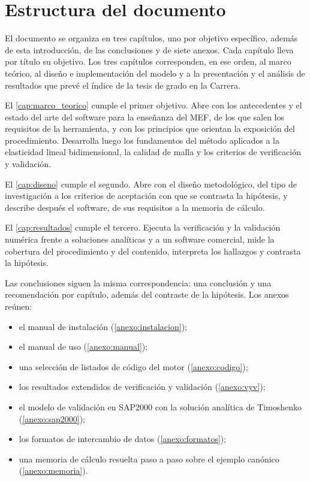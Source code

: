 \section*{Estructura del documento}

El documento se organiza en tres capítulos, uno por objetivo específico, además de esta introducción, de las conclusiones y de siete anexos. Cada capítulo lleva por título su objetivo. Los tres capítulos corresponden, en ese orden, al marco teórico, al diseño e implementación del modelo y a la presentación y el análisis de resultados que prevé el índice de la tesis de grado en la Carrera.

El \autoref{cap:marco_teorico} cumple el primer objetivo. Abre con los antecedentes y el estado del arte del software para la enseñanza del MEF, de los que salen los requisitos de la herramienta, y con los principios que orientan la exposición del procedimiento. Desarrolla luego los fundamentos del método aplicados a la elasticidad lineal bidimensional, la calidad de malla y los criterios de verificación y validación.

El \autoref{cap:diseno} cumple el segundo. Abre con el diseño metodológico, del tipo de investigación a los criterios de aceptación con que se contrasta la hipótesis, y describe después el software, de sus requisitos a la memoria de cálculo.

El \autoref{cap:resultados} cumple el tercero. Ejecuta la verificación y la validación numérica frente a soluciones analíticas y a un software comercial, mide la cobertura del procedimiento y del contenido, interpreta los hallazgos y contrasta la hipótesis.

Las conclusiones siguen la misma correspondencia: una conclusión y una recomendación por capítulo, además del contraste de la hipótesis. Los anexos reúnen:
\begin{itemize}
    \item el manual de instalación (\autoref{anexo:instalacion});
    \item el manual de uso (\autoref{anexo:manual});
    \item una selección de listados de código del motor (\autoref{anexo:codigo});
    \item los resultados extendidos de verificación y validación (\autoref{anexo:vyv});
    \item el modelo de validación en SAP2000 con la solución analítica de Timoshenko (\autoref{anexo:sap2000});
    \item los formatos de intercambio de datos (\autoref{anexo:formatos});
    \item una memoria de cálculo resuelta paso a paso sobre el ejemplo canónico (\autoref{anexo:memoria}).
\end{itemize}

